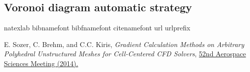 \documentclass[]{article}
\begin{document}
\subsection*{Voronoi diagram automatic strategy}
\begin{thebibliography}{19}

\expandafter\ifx\csname natexlab\endcsname\relax\def\natexlab#1{#1}\fi
\expandafter\ifx\csname bibnamefont\endcsname\relax
  \def\bibnamefont#1{#1}\fi
\expandafter\ifx\csname bibfnamefont\endcsname\relax
  \def\bibfnamefont#1{#1}\fi
\expandafter\ifx\csname citenamefont\endcsname\relax
  \def\citenamefont#1{#1}\fi
\expandafter\ifx\csname url\endcsname\relax
  \def\url#1{\texttt{#1}}\fi
\expandafter\ifx\csname urlprefix\endcsname\relax\def\urlprefix{URL }\fi
\providecommand{\bibinfo}[2]{#2}
\providecommand{\eprint}[2][]{\url{#2}}


\bibinfo{author}{\bibfnamefont{E. Sozer}},
\bibinfo{author}{\bibfnamefont{C. Brehm}},
\bibnamefont{and}
\bibinfo{author}{\bibfnamefont{C.C. Kiris}},
\emph{\bibinfo{title}{Gradient Calculation Methods on Arbitrary Polyhedral Unstructured Meshes for Cell-Centered CFD Solvers}},
\href{http://dx.doi.org/10.2514/6.2014-1440}{
\bibinfo{journal}{52nd Aerospace Sciences Meeting} 
(\bibinfo{year}{2014}).}

\end{thebibliography}
\end{document}
